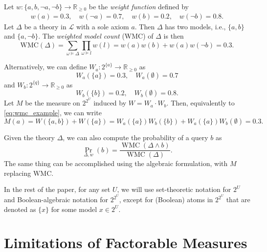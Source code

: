 \documentclass{article}
\theoremstyle{definition}
\theoremstyle{remark}
\DeclareMathOperator{\WMC}{WMC}
\begin{document}
Let $w\colon \{ a, b, \neg a, \neg b \} \to \mathbb{R}_{\ge 0}$
be the \emph{weight function} defined by
\begin{align*}
  w(a) = 0.3, \quad w(\neg a) = 0.7, \quad w(b) = 0.2, \quad w(\neg b) = 0.8.
\end{align*}
Let $\Delta$ be a theory in $\mathcal{L}$ with a sole axiom $a$. Then
$\Delta$ has two models, i.e., $\{ a, b \}$ and $\{ a, \neg b \}$. The
\emph{weighted model count} (WMC) \cite{DBLP:journals/ai/ChaviraD08} of
$\Delta$ is then
\begin{equation} \label{eq:wmc_example}
  \mathrm{WMC}(\Delta) = \sum_{\omega \models \Delta} \prod_{\omega \models l} w(l) = w(a)w(b) + w(a)w(\neg b) = 0.3.
\end{equation}

Alternatively, we can define $W_a\colon 2^{\{a\}} \to \mathbb{R}_{\ge 0}$ as
\[
  W_a(\{ a \}) = 0.3, \quad W_a(\emptyset) = 0.7
\]
and $W_b\colon 2^{\{q\}} \to \mathbb{R}_{\ge 0}$ as
\[
  W_b(\{ b \}) = 0.2, \quad W_b(\emptyset) = 0.8.
\]
Let $M$ be the measure on $2^{2^U}$ induced by $W = W_a \cdot W_b$. Then,
equivalently to \cref{eq:wmc_example}, we can write
\[
  M(a) = W(\{ a, b \}) + W(\{ a \}) = W_a(\{a\})W_b(\{b\}) +
  W_a(\{a\})W_b(\emptyset) = 0.3.
\]

Given the theory $\Delta$, we can also compute the probability of a query $b$ as
\cite{DBLP:conf/uai/Belle17,DBLP:conf/aaai/SangBK05}
\[
  \Pr_{\Delta, w}(b) = \frac{\WMC(\Delta \land b)}{\WMC(\Delta)}.
\]
The same thing can be accomplished using the algebraic formulation, with $M$
replacing $\mathrm{WMC}$.

In the rest of the paper, for any set $U$, we will use set-theoretic notation
for $2^U$ and Boolean-algebraic notation for $2^{2^U}$, except for (Boolean)
atoms in $2^{2^U}$ that are denoted as $\{x\}$ for some model $x \in 2^U$.

\section{Limitations of Factorable Measures}

\end{document}
